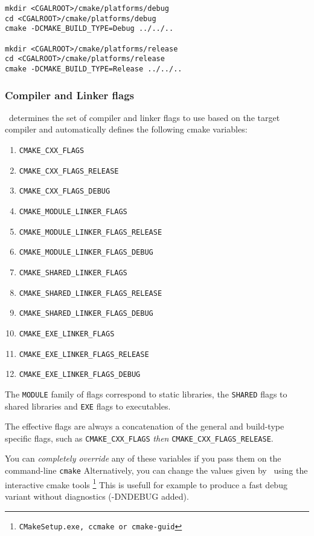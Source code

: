 {\ccTexHtml{\scriptsize}{}
\begin{verbatim}
mkdir <CGALROOT>/cmake/platforms/debug
cd <CGALROOT>/cmake/platforms/debug
cmake -DCMAKE_BUILD_TYPE=Debug ../../..

mkdir <CGALROOT>/cmake/platforms/release
cd <CGALROOT>/cmake/platforms/release
cmake -DCMAKE_BUILD_TYPE=Release ../../..
\end{verbatim}
}

\subsubsection{Compiler and Linker flags}

\cmake\ determines the set of compiler and linker flags to use based on the target compiler and automatically defines
the following cmake variables:

\begin{enumerate}
\item {\tt CMAKE\_CXX\_FLAGS}
\item {\tt CMAKE\_CXX\_FLAGS\_RELEASE}
\item {\tt CMAKE\_CXX\_FLAGS\_DEBUG}
\item {\tt CMAKE\_MODULE\_LINKER\_FLAGS}
\item {\tt CMAKE\_MODULE\_LINKER\_FLAGS\_RELEASE}
\item {\tt CMAKE\_MODULE\_LINKER\_FLAGS\_DEBUG}
\item {\tt CMAKE\_SHARED\_LINKER\_FLAGS}
\item {\tt CMAKE\_SHARED\_LINKER\_FLAGS\_RELEASE}
\item {\tt CMAKE\_SHARED\_LINKER\_FLAGS\_DEBUG}
\item {\tt CMAKE\_EXE\_LINKER\_FLAGS}
\item {\tt CMAKE\_EXE\_LINKER\_FLAGS\_RELEASE}
\item {\tt CMAKE\_EXE\_LINKER\_FLAGS\_DEBUG}
\end{enumerate}

The {\tt MODULE} family of flags correspond to static libraries, the {\tt SHARED} flags to shared libraries
and {\tt EXE} flags to executables.

The effective flags are always a concatenation of the general and build-type specific flags, such as
{\tt CMAKE\_CXX\_FLAGS} {\em then} {\tt CMAKE\_CXX\_FLAGS\_RELEASE}.

You can {\em completely override} any of these variables if you pass them on the command-line {\tt cmake}
Alternatively, you can change the values given by \cmake\ using the interactive cmake tools
\footnote{{\tt CMakeSetup.exe, ccmake or cmake-guid}}  This is usefull for example to produce a fast debug
variant without diagnostics (-DNDEBUG added). 

